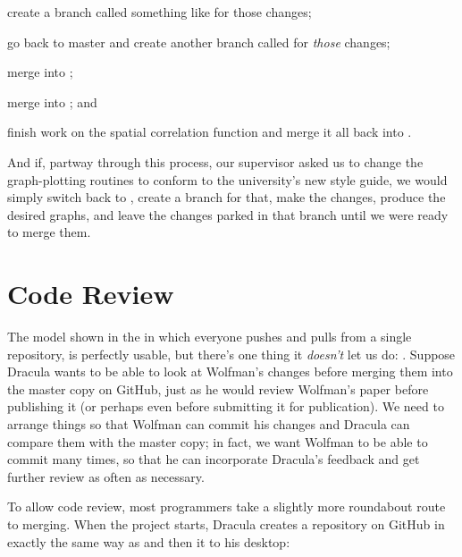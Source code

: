 \begin{swcenumerate}
\item
  create a branch called something like
   for those changes;
\item
  go back to master and create another branch called
   for \emph{those} changes;
\item
  merge  into
  ;
\item
  merge  into ; and
\item
  finish work on the spatial correlation function and merge it all back
  into .
\end{swcenumerate}

And if, partway through this process, our supervisor asked us to change
the graph-plotting routines to conform to the university's new style
guide, we would simply switch back to , create a branch
for that, make the changes, produce the desired graphs, and leave the
changes parked in that branch until we were ready to merge them.

\section{Code Review}

The model shown in the  in
which everyone pushes and pulls from a single repository, is perfectly
usable, but there's one thing it \emph{doesn't} let us do:
. Suppose Dracula wants to be able
to look at Wolfman's changes before merging them into the master copy on
GitHub, just as he would review Wolfman's paper before publishing it (or
perhaps even before submitting it for publication). We need to arrange
things so that Wolfman can commit his changes and Dracula can compare
them with the master copy; in fact, we want Wolfman to be able to commit
many times, so that he can incorporate Dracula's feedback and get
further review as often as necessary.

To allow code review, most programmers take a slightly more roundabout
route to merging. When the project starts, Dracula creates a repository
on GitHub in exactly the same way as  and then
 it to his desktop:


